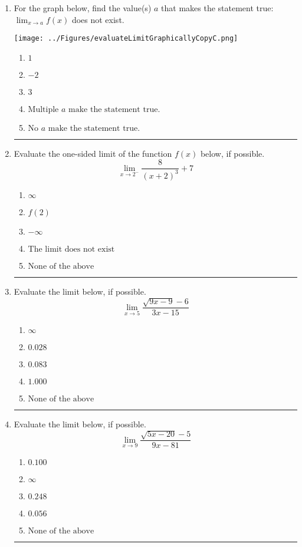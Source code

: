 \documentclass[14pt]{extbook}
\newcommand{\litem}[1]{\item#1\hspace*{-1cm}\rule{\textwidth}{0.4pt}}
\begin{document}
\begin{enumerate}
{\begin{enumerate}[label=\Alph*.]
\end{enumerate} }
\litem{
For the graph below, find the value(s) $a$ that makes the statement true: $ \displaystyle \lim_{x \rightarrow a} f(x)$ does not exist.
\begin{center}
    \texttt{[image: ../Figures/evaluateLimitGraphicallyCopyC.png]}
\end{center}
\begin{enumerate}[label=\Alph*.]
\item \( 1 \)
\item \( -2 \)
\item \( 3 \)
\item \( \text{Multiple } a \text{ make the statement true}. \)
\item \( \text{No } a \text{ make the statement true}. \)

\end{enumerate} }
\litem{
Evaluate the one-sided limit of the function $f(x)$ below, if possible.\[ \lim_{x \rightarrow 2^-} \frac{8}{(x+2)^3}+7 \]\begin{enumerate}[label=\Alph*.]
\item \( \infty \)
\item \( f(2) \)
\item \( -\infty \)
\item \( \text{The limit does not exist} \)
\item \( \text{None of the above} \)

\end{enumerate} }
\litem{
Evaluate the limit below, if possible.\[ \lim_{x \rightarrow 5} \frac{\sqrt{9x - 9} - 6}{3x - 15} \]\begin{enumerate}[label=\Alph*.]
\item \( \infty \)
\item \( 0.028 \)
\item \( 0.083 \)
\item \( 1.000 \)
\item \( \text{None of the above} \)

\end{enumerate} }
\litem{
Evaluate the limit below, if possible.\[ \lim_{x \rightarrow 9} \frac{\sqrt{5x - 20} - 5}{9x - 81} \]\begin{enumerate}[label=\Alph*.]
\item \( 0.100 \)
\item \( \infty \)
\item \( 0.248 \)
\item \( 0.056 \)
\item \( \text{None of the above} \)


\end{enumerate}}
\end{enumerate}
\end{document}
